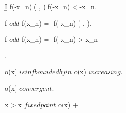 \documentclass[../Main/main]{subfiles}
\begin{document}
{{{{{						\b{I} \imp f(-x_n) \in ( , \infty) \logicAnd f(-x_n) < -x_n.

						f $ odd $ \imp f(x_n) = -f(-x_n) \in ( \frac{ \sqrt{ 3 } }{ 2 }, \infty).

						f $ odd $ \imp f(x_n) = -f(-x_n) > x_n
					}.

					\conclude o(x) $ is inf bounded by in $  \logicAnd o(x) $ increasing $.

					o(x) $ convergent $.

					\nexists \;  x >  \suchthat x $ fixed point $ \imp o(x) \convergesto +\infty

				}	

		}
	}
}
\end{document}
